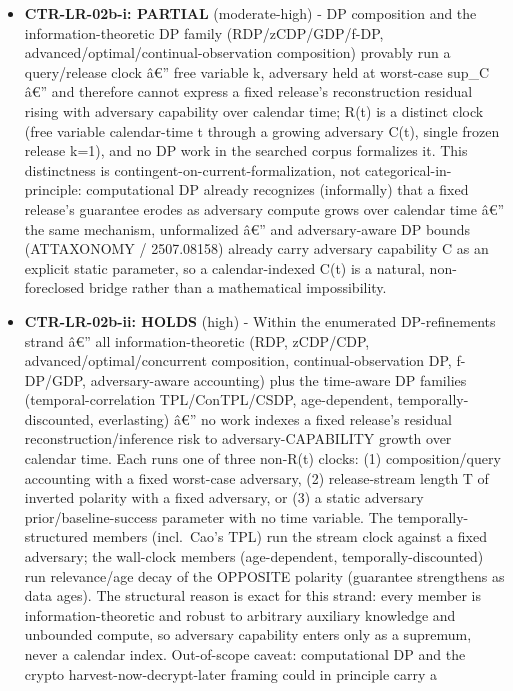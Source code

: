 \documentclass[
  11pt,
]{article}
\begin{document}
\begin{itemize}
\item
  \textbf{CTR-LR-02b-i: PARTIAL} (moderate-high) - DP composition and
  the information-theoretic DP family (RDP/zCDP/GDP/f-DP,
  advanced/optimal/continual-observation composition) provably run a
  query/release clock â€'' free variable k, adversary held at worst-case
  sup\_C â€'' and therefore cannot express a fixed release's
  reconstruction residual rising with adversary capability over calendar
  time; R(t) is a distinct clock (free variable calendar-time t through
  a growing adversary C(t), single frozen release k=1), and no DP work
  in the searched corpus formalizes it. This distinctness is
  contingent-on-current-formalization, not categorical-in-principle:
  computational DP already recognizes (informally) that a fixed
  release's guarantee erodes as adversary compute grows over calendar
  time â€'' the same mechanism, unformalized â€'' and adversary-aware DP
  bounds (ATTAXONOMY / 2507.08158) already carry adversary capability C
  as an explicit static parameter, so a calendar-indexed C(t) is a
  natural, non-foreclosed bridge rather than a mathematical
  impossibility.
\item
  \textbf{CTR-LR-02b-ii: HOLDS} (high) - Within the enumerated
  DP-refinements strand â€'' all information-theoretic (RDP, zCDP/CDP,
  advanced/optimal/concurrent composition, continual-observation DP,
  f-DP/GDP, adversary-aware accounting) plus the time-aware DP families
  (temporal-correlation TPL/ConTPL/CSDP, age-dependent,
  temporally-discounted, everlasting) â€'' no work indexes a fixed
  release's residual reconstruction/inference risk to
  adversary-CAPABILITY growth over calendar time. Each runs one of three
  non-R(t) clocks: (1) composition/query accounting with a fixed
  worst-case adversary, (2) release-stream length T of inverted polarity
  with a fixed adversary, or (3) a static adversary
  prior/baseline-success parameter with no time variable. The
  temporally-structured members (incl.~Cao's TPL) run the stream clock
  against a fixed adversary; the wall-clock members (age-dependent,
  temporally-discounted) run relevance/age decay of the OPPOSITE
  polarity (guarantee strengthens as data ages). The structural reason
  is exact for this strand: every member is information-theoretic and
  robust to arbitrary auxiliary knowledge and unbounded compute, so
  adversary capability enters only as a supremum, never a calendar
  index. Out-of-scope caveat: computational DP and the crypto
  harvest-now-decrypt-later framing could in principle carry a

\end{itemize}
\end{document}
